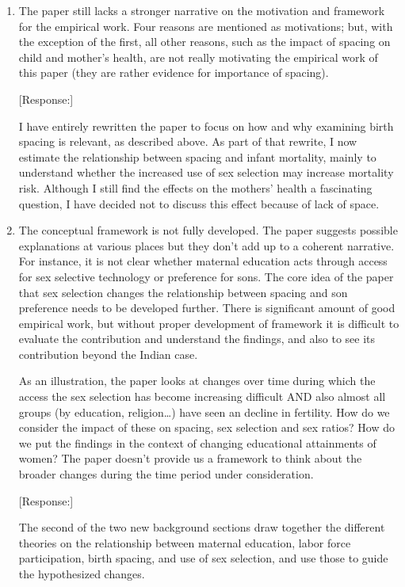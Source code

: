\documentclass[letterpaper,12pt]{article}
\begin{document}
\begin{enumerate}

\item The paper still lacks a stronger narrative on the motivation and
framework for the empirical work. Four reasons are mentioned as
motivations; but, with the exception of the first, all other reasons,
such as the impact of spacing on child and mother’s health, are not
really motivating the empirical work of this paper (they are rather
evidence for importance of spacing).

[Response:]

I have entirely rewritten the paper to focus on how and why examining
birth spacing is relevant, as described above. As part of that rewrite,
I now estimate the relationship between spacing and infant mortality,
mainly to understand whether the increased use of sex selection may
increase mortality risk. Although I still find the effects on the
mothers' health a fascinating question, I have decided not to discuss
this effect because of lack of space.
 

\item The conceptual framework is not fully developed. The paper suggests
possible explanations at various places but they don’t add up to a
coherent narrative. For instance, it is not clear whether maternal
education acts through access for sex selective technology or preference
for sons. The core idea of the paper that sex selection changes the
relationship between spacing and son preference needs to be developed
further. There is significant amount of good empirical work, but without
proper development of framework it is difficult to evaluate the
contribution and understand the findings, and also to see its
contribution beyond the Indian case.

As an illustration, the paper looks at changes over time during which
the access the sex selection has become increasing difficult AND also
almost all groups (by education, religion…) have seen an decline in
fertility. How do we consider the impact of these on spacing, sex
selection and sex ratios? How do we put the findings in the context of
changing educational attainments of women? The paper doesn’t provide us
a framework to think about the broader changes during the time period
under consideration.

[Response:]

The second of the two new background sections draw together the
different theories on the relationship between maternal education, labor
force participation, birth spacing, and use of sex selection, and use
those to guide the hypothesized changes.


\end{enumerate}
\end{document}
